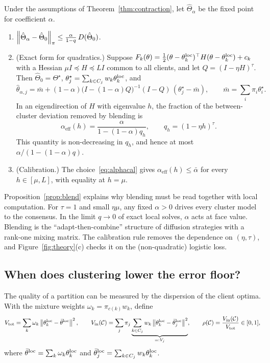\begin{proposition}\label{prop:blend}
Under the assumptions of Theorem~\ref{thm:contraction}, let $\hat\Theta_\alpha$ be the fixed
point for coefficient $\alpha$.
\begin{enumerate}[label=(\alph*),leftmargin=1.6em,itemsep=1pt]
  \item $\left\lVert \hat\Theta_\alpha-\hat\Theta_0 \right\rVert_{\pi}\le\frac{\alpha}{1-q}\,D(\hat\Theta_0)$.
  \item (Exact form for quadratics.) Suppose
    $F_k(\theta)=\tfrac12(\theta-\theta_k^{\mathrm{loc}})^\top H(\theta-\theta_k^{\mathrm{loc}})+c_k$ with a
    Hessian $\mu I\preceq H\preceq LI$ common to all clients, and let $Q=(I-\eta H)^{\tau}$.
    Then $\hat\Theta_0=\Theta^\star$, $\theta_j^\star=\sum_{k\in C_j}w_k\theta_k^{\mathrm{loc}}$, and
    \[
      \hat\theta_{\alpha,j}=\bar m+(1-\alpha)\bigl(I-(1-\alpha)Q\bigr)^{-1}(I-Q)\,(\theta_j^\star-\bar m),
      \qquad\bar m=\textstyle\sum_i\pi_i\theta_i^\star .
    \]
    In an eigendirection of $H$ with eigenvalue $h$, the fraction of the between-cluster
    deviation removed by blending is
    \[
      \alpha_{\mathrm{eff}}(h)=\frac{\alpha}{1-(1-\alpha)q_h},\qquad q_h=(1-\eta h)^{\tau}.
    \]
    This quantity is non-decreasing in $q_h$, and hence at most $\alpha/(1-(1-\alpha)q)$.
  \item (Calibration.) The choice~\eqref{eq:alphacal} gives
    $\alpha_{\mathrm{eff}}(h)\le\bar\alpha$ for every $h\in[\mu,L]$, with equality at
    $h=\mu$.
\end{enumerate}
\end{proposition}

Proposition~\ref{prop:blend} explains why blending must be read together with local
computation. For $\tau=1$ and small $\eta\mu$, any fixed $\alpha>0$ drives every cluster
model to the consensus. In the limit $q\to0$ of exact local solves, $\alpha$ acts at face
value. Blending is the ``adapt-then-combine'' structure of diffusion strategies
\citep{sayed2014adaptation} with a rank-one mixing matrix. The calibration rule removes the
dependence on $(\eta,\tau)$, and Figure~\ref{fig:theory}(c) checks it on the
(non-quadratic) logistic loss.

\subsection{When does clustering lower the error floor?}

The quality of a partition can be measured by the dispersion of the client optima. With the
mixture weights $\omega_k=\pi_{c(k)}w_k$, define
\[
  V_{\mathrm{tot}}=\sum_k\omega_k\left\lVert \theta_k^{\mathrm{loc}}-\bar\theta^{\mathrm{loc}} \right\rVert^2,\qquad
  V_{\mathrm{in}}(\mathcal{C})=\sum_j\pi_j\underbrace{\sum_{k\in C_j}w_k\left\lVert \theta_k^{\mathrm{loc}}-\bar\theta_j^{\mathrm{loc}} \right\rVert^2}_{=:V_j},\qquad
  \rho(\mathcal{C})=\frac{V_{\mathrm{in}}(\mathcal{C})}{V_{\mathrm{tot}}}\in[0,1],
\]
where $\bar\theta^{\mathrm{loc}}=\sum_k\omega_k\theta^{\mathrm{loc}}_k$ and
$\bar\theta_j^{\mathrm{loc}}=\sum_{k\in C_j}w_k\theta_k^{\mathrm{loc}}$.

